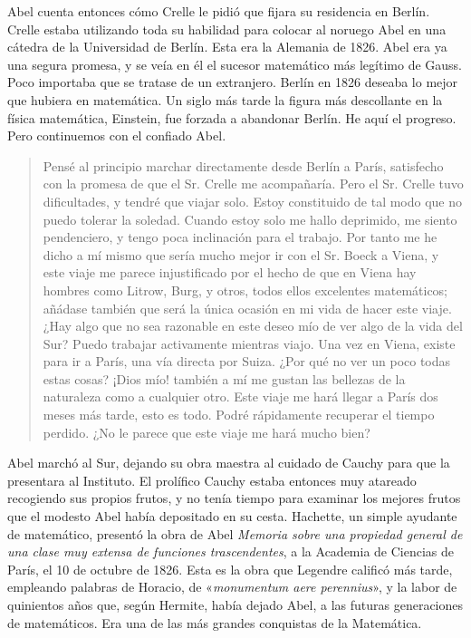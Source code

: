 \documentclass[a4paper, 12pt, draft]{article}
\begin{document}
Abel cuenta entonces cómo Crelle le pidió que fijara su residencia en Berlín. Crelle estaba utilizando toda su habilidad para colocar al noruego Abel en una cátedra de la Universidad de Berlín. Esta era la Alemania de 1826. Abel era ya una segura promesa, y se veía en él el sucesor matemático más legítimo de Gauss. Poco importaba que se tratase de un extranjero. Berlín en 1826 deseaba lo mejor que hubiera en matemática. Un siglo más tarde la figura más descollante en la física matemática, Einstein, fue forzada a abandonar Berlín. He aquí el progreso. Pero continuemos con el confiado Abel.

\begin{quote}\small

Pensé al principio marchar directamente desde Berlín a París, satisfecho con la promesa de que el Sr. Crelle me acompañaría. Pero el Sr. Crelle tuvo dificultades, y tendré que viajar solo. Estoy constituido de tal modo que no puedo tolerar la soledad. Cuando estoy solo me hallo deprimido, me siento pendenciero, y tengo poca inclinación para el trabajo. Por tanto me he dicho a mí mismo que sería mucho mejor ir con el Sr. Boeck a Viena, y este viaje me parece injustificado por el hecho de que en Viena hay hombres como Litrow, Burg, y otros, todos ellos excelentes matemáticos; añádase también que será la única ocasión en mi vida de hacer este viaje. ¿Hay algo que no sea razonable en este deseo mío de ver algo de la vida del Sur? Puedo trabajar activamente mientras viajo. Una vez en Viena, existe para ir a París, una vía directa por Suiza. ¿Por qué no ver un poco todas estas cosas? ¡Dios mío! también a mí me gustan las bellezas de la naturaleza como a cualquier otro. Este viaje me hará llegar a París dos meses más tarde, esto es todo. Podré rápidamente recuperar el tiempo perdido. ¿No le parece que este viaje me hará mucho bien?

\end{quote}

Abel marchó al Sur, dejando su obra maestra al cuidado de Cauchy para que la presentara al Instituto. El prolífico Cauchy estaba entonces muy atareado recogiendo sus propios frutos, y no tenía tiempo para examinar los mejores frutos que el modesto Abel había depositado en su cesta. Hachette, un simple ayudante de matemático, presentó la obra de Abel {\it Memoria sobre una propiedad general de una clase muy extensa de funciones trascendentes}, a la Academia de Ciencias de París, el 10 de octubre de 1826. Esta es la obra que Legendre calificó más tarde, empleando palabras de Horacio, de «{\it monumentum aere perennius}», y la labor de quinientos años que, según Hermite, había dejado Abel, a las futuras generaciones de matemáticos. Era una de las más grandes conquistas de la Matemática.
\end{document}
